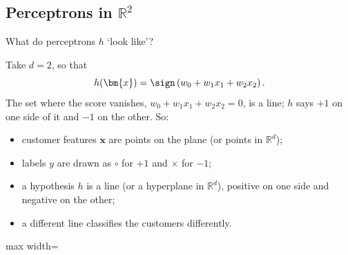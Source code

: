 \subsection{Perceptrons in \(\mathbb{R}^2\)}

\begin{question}
    What do perceptrons \(h\) `look like'?
\end{question}

Take \(d = 2\), so that
\[
    h(\bm{x}) = \sign \left( w_0 + w_1 x_1 + w_2 x_2 \right).
\]
The set where the score vanishes, \(w_0 + w_1 x_1 + w_2 x_2 = 0\), is a line;
\(h\) says \(+1\) on one side of it and \(-1\) on the other. So:

\begin{itemize}
    \item customer features \(\bm{x}\) are points on the plane (or points in
        \(\mathbb{R}^d\));
    \item labels \(y\) are drawn as \(\circ\) for \(+1\) and \(\times\) for
        \(-1\);
    \item a hypothesis \(h\) is a line (or a hyperplane in \(\mathbb{R}^d\)),
        positive on one side and negative on the other;
    \item a different line classifies the customers differently.
\end{itemize}

\begin{center}
    \begin{adjustbox}{max width=\textwidth}
    \end{adjustbox}
\end{center}

